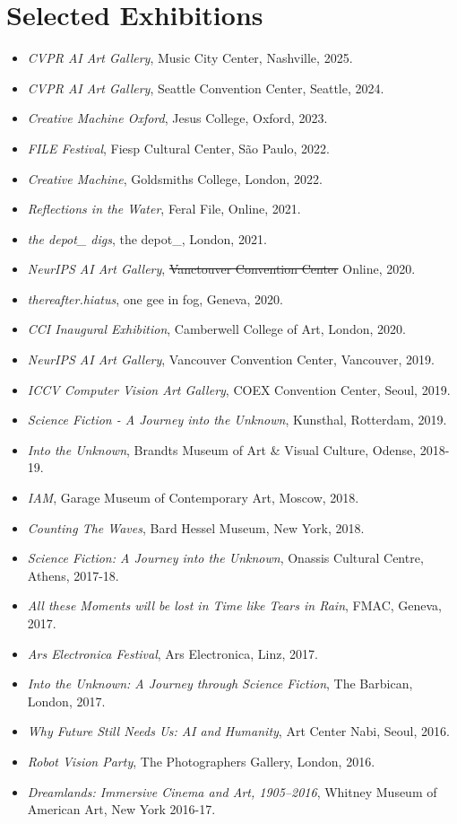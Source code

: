 \documentclass[letterpaper,11pt]{article}
\newcommand{\resumeItem}[2]{
  \item\small{
    \textbf{#1}{ #2 \vspace{-2pt}}
  }
}
\newcommand{\resumeSubItem}[2]{\resumeItem{#1}{#2}\vspace{-4pt}}
\newcommand{\resumeSubHeadingListStart}{\begin{itemize}[leftmargin=*]}
\newcommand{\resumeSubHeadingListEnd}{\end{itemize}}
\begin{document}
\section{Selected Exhibitions}
 \resumeSubHeadingListStart
  \resumeSubItem{}{\textit{CVPR AI Art Gallery}, Music City Center, Nashville, 2025.}
  \resumeSubItem{}{\textit{CVPR AI Art Gallery}, Seattle Convention Center, Seattle, 2024.}
  \resumeSubItem{}{\textit{Creative Machine Oxford}, Jesus College, Oxford, 2023.}
  \resumeSubItem{}{\textit{FILE Festival}, Fiesp Cultural Center, São Paulo, 2022.}
  \resumeSubItem{}{\textit{Creative Machine}, Goldsmiths College, London, 2022.}
  \resumeSubItem{}{\textit{Reflections in the Water}, Feral File, Online, 2021.}
  \resumeSubItem{}{\textit{the depot\_ digs}, the depot\_, London, 2021.}
  \resumeSubItem{}{\textit{NeurIPS AI Art Gallery}, \sout{Vanctouver Convention Center} Online, 2020.}
  \resumeSubItem{}{\textit{thereafter.hiatus}, one gee in fog, Geneva, 2020. }
  \resumeSubItem{}{\textit{CCI Inaugural Exhibition}, Camberwell College of Art, London, 2020. }
  \resumeSubItem{}{\textit{NeurIPS AI Art Gallery}, Vancouver Convention Center, Vancouver, 2019.}
  \resumeSubItem{}{\textit{ICCV Computer Vision Art Gallery}, COEX Convention Center, Seoul, 2019. }
  \resumeSubItem{}{\textit{Science Fiction - A Journey into the Unknown}, Kunsthal, Rotterdam, 2019.}
  \resumeSubItem{}{\textit{Into the Unknown}, Brandts Museum of Art \& Visual Culture, Odense, 2018-19.}
  \resumeSubItem{}{\textit{IAM}, Garage Museum of Contemporary Art, Moscow, 2018.}
  \resumeSubItem{}{\textit{Counting The Waves}, Bard Hessel Museum, New York, 2018. }
  \resumeSubItem{}{\textit{Science Fiction: A Journey into the Unknown}, Onassis Cultural Centre, Athens, 2017-18.}
  \resumeSubItem{}{\textit{All these Moments will be lost in Time like Tears in Rain}, FMAC, Geneva, 2017. }
  \resumeSubItem{}{\textit{Ars Electronica Festival}, Ars Electronica, Linz, 2017. }
  \resumeSubItem{}{\textit{Into the Unknown: A Journey through Science Fiction}, The Barbican, London, 2017.}
  \resumeSubItem{}{\textit{Why Future Still Needs Us: AI and Humanity}, Art Center Nabi, Seoul, 2016.}
  \resumeSubItem{}{\textit{Robot Vision Party}, The Photographers Gallery, London, 2016.}
  \resumeSubItem{}{\textit{Dreamlands: Immersive Cinema and Art, 1905–2016}, Whitney Museum of American Art, New York 2016-17.}
 \resumeSubHeadingListEnd

\end{document}
